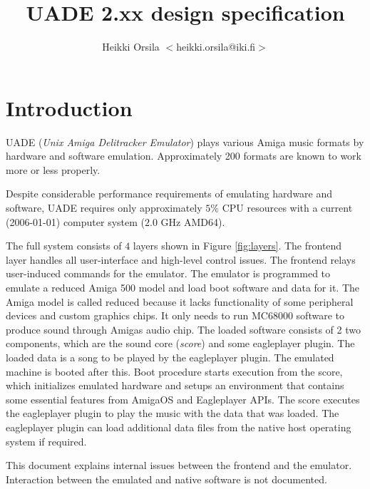 \documentclass{article}
\begin{document}
\title{UADE 2.xx design specification}
\author{Heikki Orsila $<$heikki.orsila@iki.fi$>$}
\date{}
\maketitle

\section{Introduction}

UADE (\emph{Unix Amiga Delitracker Emulator}) plays various
Amiga music formats by hardware and software emulation.
Approximately 200 formats are known to work more or less properly.

Despite
considerable performance requirements of emulating hardware and software,
UADE requires only approximately $5$\% CPU resources with a current
(2006-01-01) computer system ($2.0$ GHz AMD64).

The full system consists of $4$ layers shown in Figure
\ref{fig:layers}. The frontend layer handles all user-interface and high-level
control issues. The frontend relays user-induced commands for the emulator.
The emulator is programmed to emulate a reduced Amiga 500 model and load
boot software and data for it. The Amiga model is called reduced because 
it lacks
functionality of some peripheral devices and custom graphics chips. It only
needs to run MC68000 software to produce sound through Amigas audio
chip. The loaded software consists of 2 two components, which are the sound
core (\emph{score}) and some eagleplayer plugin. The loaded data is a song to
be played by the eagleplayer plugin.
The emulated machine is booted after this.
Boot procedure starts execution from the score, which initializes emulated
hardware and setups an environment that contains some essential features
from AmigaOS and Eagleplayer APIs.
The score executes the eagleplayer plugin to play the music with the data
that was loaded. The eagleplayer plugin can load additional
data files from the native host operating system if required.

This document explains internal issues between the frontend and the emulator.
Interaction between the emulated and native software is not documented.
 
\end{document}
